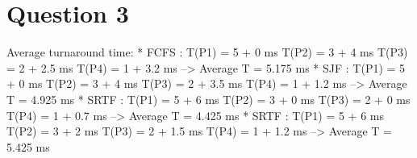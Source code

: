 \documentclass[10pt, a4paper]{article}
\begin{document}
\fbox{
\theverbbox
}

\section{Question 3}

\begin{verbbox}
Average turnaround time:
* FCFS	: 
	T(P1) = 5 + 0 ms
	T(P2) = 3 + 4 ms
	T(P3) = 2 + 2.5 ms
	T(P4) = 1 + 3.2 ms
   -->  Average T = 5.175 ms
* SJF	: 
	T(P1) = 5 + 0 ms
	T(P2) = 3 + 4 ms
	T(P3) = 2 + 3.5 ms
	T(P4) = 1 + 1.2 ms
   -->  Average T = 4.925 ms
* SRTF	: 
	T(P1) = 5 + 6 ms
	T(P2) = 3 + 0 ms
	T(P3) = 2 + 0 ms
	T(P4) = 1 + 0.7 ms
   -->  Average T = 4.425 ms  
* SRTF	: 
	T(P1) = 5 + 6 ms
	T(P2) = 3 + 2 ms
	T(P3) = 2 + 1.5 ms
	T(P4) = 1 + 1.2 ms
   -->  Average T = 5.425 ms
\end{verbbox}

\fbox{
\theverbbox
}
\end{document}
